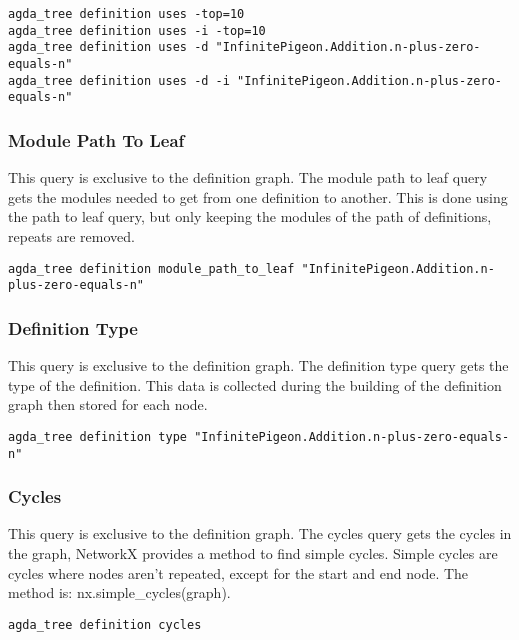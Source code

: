 \begin{lstlisting}
agda_tree definition uses -top=10
agda_tree definition uses -i -top=10
agda_tree definition uses -d "InfinitePigeon.Addition.n-plus-zero-equals-n"
agda_tree definition uses -d -i "InfinitePigeon.Addition.n-plus-zero-equals-n"
\end{lstlisting}

\subsubsection{Module Path To Leaf}

This query is exclusive to the definition graph. The module path to leaf query
gets the modules needed to get from one definition to another. This is done
using the path to leaf query, but only keeping the modules of the path of
definitions, repeats are removed.

\begin{lstlisting}
agda_tree definition module_path_to_leaf "InfinitePigeon.Addition.n-plus-zero-equals-n"
\end{lstlisting}

\subsubsection{Definition Type}

This query is exclusive to the definition graph. The definition type query gets
the type of the definition. This data is collected during the building of the
definition graph then stored for each node.

\begin{lstlisting}
agda_tree definition type "InfinitePigeon.Addition.n-plus-zero-equals-n"
\end{lstlisting}

\subsubsection{Cycles}

This query is exclusive to the definition graph. The cycles query gets the
cycles in the graph, NetworkX provides a method to find simple cycles. Simple
cycles are cycles where nodes aren't repeated, except for the start and end
node. The method is: \textsf{nx.simple\_cycles(graph)}.

\begin{lstlisting}
agda_tree definition cycles
\end{lstlisting}

